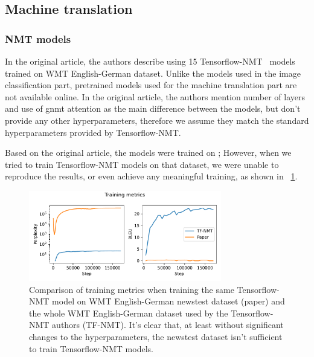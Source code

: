 \subsection{Machine translation}

\subsubsection{NMT models} %

In the original article, the authors describe using 15 Tensorflow-NMT~\cite{luong17} models trained on WMT English-German dataset. Unlike the models used in the image classification part, pretrained models used for the machine translation part are not available online. In the original article, the authors mention number of layers and use of gnmt attention as the main difference between the models, but don't provide any other hyperparameters, therefore we assume they match the standard hyperparameters provided by Tensorflow-NMT.

Based on the original article, the models were trained on ; However, when we tried to train Tensorflow-NMT models on that dataset, we were unable to reproduce the results, or even achieve any meaningful training, as shown in \figurename~\ref{fig:tf-nmt_paper_training}.

\begin{figure}[h]
    \centering
    \includegraphics[width=0.75\textwidth]{figures/tf-nmt_paper_training.pdf}
    \caption{Comparison of training metrics when training the same Tensorflow-NMT model on WMT English-German newstest dataset (paper) and the whole WMT English-German dataset used by the Tensorflow-NMT authors (TF-NMT). It's clear that, at least without significant changes to the hyperparameters, the newstest dataset isn't sufficient to train Tensorflow-NMT models.}
    \label{fig:tf-nmt_paper_training}
\end{figure}


